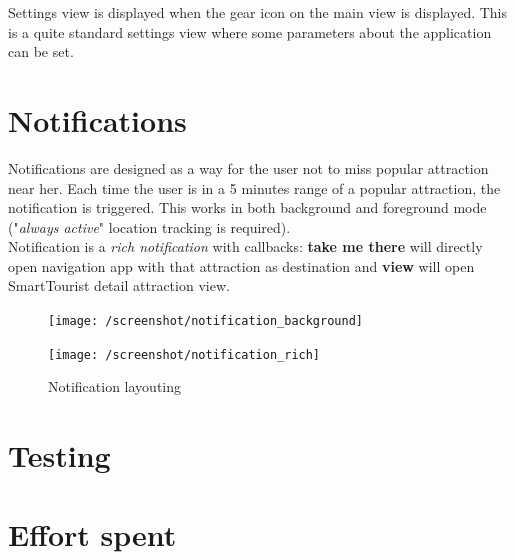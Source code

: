 \documentclass[a4paper, 11pt, parskip=half]{scrreprt}
\theoremstyle{definition}
\begin{document}
Settings view is displayed when the gear icon on the main view is displayed. This is a quite standard settings view where some parameters about the application can be set.


\chapter{Notifications}
Notifications are designed as a way for the user not to miss popular attraction near her. Each time the user is in a 5 minutes range of a popular attraction, the notification is triggered. This works in both background and foreground mode ("\textit{always active}" location tracking is required).
\\Notification is a \textit{rich notification} with callbacks: \textbf{take me there} will directly open navigation app with that attraction as destination and \textbf{view} will open SmartTourist detail attraction view.

\begin{figure}[H]
	\centering
	\begin{minipage}{.5\textwidth}
  	\centering
  	\texttt{[image: /screenshot/notification\_background]}
  	\label{fig:test1}
	\end{minipage}%
	\begin{minipage}{.5\textwidth}
  	\centering
  	\texttt{[image: /screenshot/notification\_rich]}
  	\label{fig:test2}
	\end{minipage}
	\caption{Notification layouting}
\end{figure}

\chapter{Testing}

\chapter{Effort spent}
\end{document}
